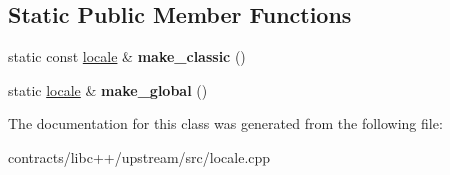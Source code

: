 \subsection*{Static Public Member Functions}
\begin{DoxyCompactItemize}
\item 
\mbox{\label{classlocale_a0aaf593d89223ff290102564b05c7f51}} 
static const \mbox{\hyperlink{classlocale}{locale}} \& {\bfseries make\+\_\+classic} ()
\item 
\mbox{\label{classlocale_a0a2a831b35af0c49f820444e2a1a75b3}} 
static \mbox{\hyperlink{classlocale}{locale}} \& {\bfseries make\+\_\+global} ()
\end{DoxyCompactItemize}


The documentation for this class was generated from the following file\+:\begin{DoxyCompactItemize}
\item 
contracts/libc++/upstream/src/locale.\+cpp\end{DoxyCompactItemize}
